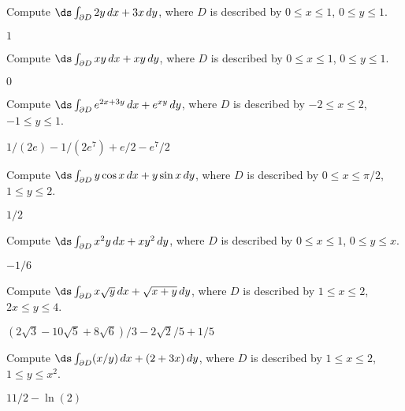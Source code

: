 \begin{enumialphparenastyle}

\begin{ex}
Compute $\ds\int_{\partial D} 2y\,dx + 3x\,dy$, 
where $D$ is described by $0\le x\le1$, $0\le y\le 1$.
\begin{sol}
	$1$
\end{sol}
\end{ex}

\begin{ex}
Compute $\ds\int_{\partial D} xy\,dx + xy\,dy$, 
where $D$ is described by $0\le x\le1$, $0\le y\le 1$.
\begin{sol}
	$0$
\end{sol}
\end{ex}

\begin{ex}
Compute $\ds\int_{\partial D} e^{2x+3y}\,dx + e^{xy}\,dy$, 
where $D$ is described by $-2\le x\le 2$, $-1\le y\le 1$.
\begin{sol}
	$1/(2e)-1/(2e^7)+e/2-e^7/2$
\end{sol}
\end{ex}

\begin{ex}
Compute $\ds\int_{\partial D} y\cos x\,dx + y\sin x\,dy$, 
where $D$ is described by $0\le x\le \pi/2$, $1\le y\le 2$.
\begin{sol}
	$1/2$
\end{sol}
\end{ex}

\begin{ex}
Compute $\ds\int_{\partial D} x^2y\,dx + xy^2\,dy$, 
where $D$ is described by $0\le x\le 1$, $0\le y\le x$.
\begin{sol}
	$-1/6$
\end{sol}
\end{ex}

\begin{ex}
Compute $\ds\int_{\partial D} x\sqrt{y}\,dx + \sqrt{x+y}\,dy$, 
where $D$ is described by $1\le x\le 2$, $2x\le y\le 4$.
\begin{sol}
	$(2\sqrt3-10\sqrt5+8\sqrt6)/3-2\sqrt2/5+1/5$
\end{sol}
\end{ex}

\begin{ex}
Compute $\ds\int_{\partial D} (x/y)\,dx + (2+3x)\,dy$, 
where $D$ is described by $1\le x\le 2$, $1\le y\le x^2$.
\begin{sol}
	$11/2-\ln(2)$
\end{sol}
\end{ex}


\end{enumialphparenastyle}
